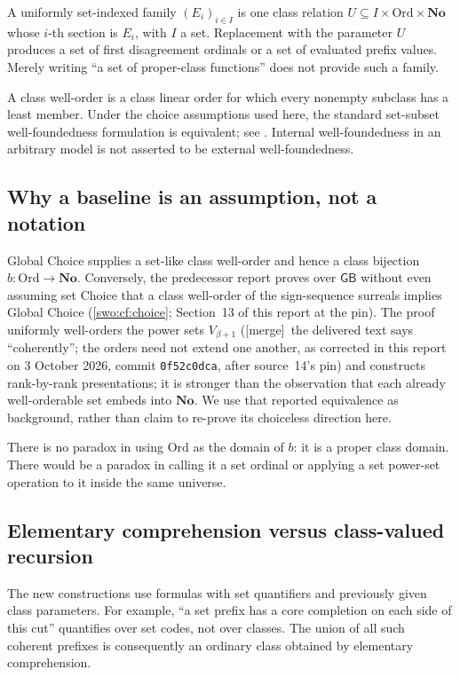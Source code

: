 \documentclass[11pt]{article}
\theoremstyle{definition}
\theoremstyle{remark}
\newcommand{\No}{\mathbf{No}}
\newcommand{\Ord}{\mathrm{Ord}}
\newcommand{\GB}{\mathsf{GB}}
\newcommand{\code}[1]{\texttt{\small #1}}
\newcommand{\merge}{\textsf{[merge]}}
\begin{document}
A uniformly set-indexed family $(E_i)_{i\in I}$ is one class relation
$U\subseteq I\times\Ord\times\No$ whose $i$-th section is $E_i$, with
$I$ a set. Replacement with the parameter $U$ produces a set of first
disagreement ordinals or a set of evaluated prefix values. Merely writing
``a set of proper-class functions'' does not provide such a family.

A class well-order is a class linear order for which every nonempty
subclass has a least member. Under the choice assumptions used here,
the standard set-subset well-foundedness formulation is equivalent;
see \cite[Section~3]{HamkinsWoodin}. Internal well-foundedness in an arbitrary
model is not asserted to be external well-foundedness.

\subsection{Why a baseline is an assumption, not a notation}
Global Choice supplies a set-like class well-order and hence a class
bijection $b:\Ord\to\No$. Conversely, the predecessor report proves
over $\GB$ without even assuming set Choice that a class well-order of
the sign-sequence surreals implies Global Choice
(\cref{swo:cf:choice}; Section~13 of this report at the pin). The proof
uniformly well-orders the power sets $V_{\beta+1}$ (\merge\ the delivered
text says ``coherently''; the orders need not extend one another, as
corrected in this report on 3 October 2026, commit \code{0f52c0dca}, after
source~14's pin) and constructs rank-by-rank presentations; it is stronger than the
observation that each already well-orderable set embeds into $\No$.
We use that reported equivalence as background, rather than claim to
re-prove its choiceless direction here.

There is no paradox in using $\Ord$ as the domain of $b$: it is a
proper class domain. There would be a paradox in calling it a set
ordinal or applying a set power-set operation to it inside the same
universe.

\subsection{Elementary comprehension versus class-valued recursion}
The new constructions use formulas with set quantifiers and previously
given class parameters. For example, ``a set prefix has a core completion
on each side of this cut'' quantifies over set codes, not over classes.
The union of all such coherent prefixes is consequently an ordinary
class obtained by elementary comprehension.
\end{document}
